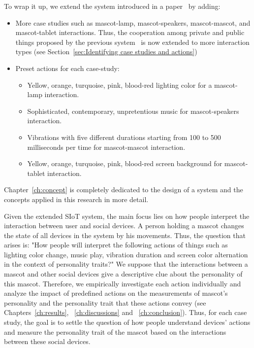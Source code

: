 To wrap it up, we extend the system introduced in a paper~\cite{okada2016autonomous} by adding:
\begin{itemize}
    \item More case studies such as mascot-lamp, mascot-speakers, mascot-mascot, and mascot-tablet interactions.
    Thus, the cooperation among private and public things proposed by the previous system~\cite{okada2016autonomous}
    is now extended to more interaction types (see Section~\ref{sec:Identifying case studies and actions})
    \item Preset actions for each case-study:
    \begin{itemize}
        \item Yellow, orange, turquoise, pink, blood-red lighting color for a mascot-lamp interaction.
        \item Sophisticated, contemporary, unpretentious music for mascot-speakers interaction.
        \item Vibrations with five different durations starting from 100 to
        500 milliseconds per time for mascot-mascot interaction.
        \item Yellow, orange, turquoise, pink, blood-red screen background for mascot-tablet interaction.
    \end{itemize}
\end{itemize}
Chapter~\ref{ch:concept} is completely dedicated to the design of a system and
the concepts applied in this research in more detail.

Given the extended SIoT system, the main focus lies on how people interpret
the interaction between user and social devices.
A person holding a mascot changes the state of all devices in the system by his movements.
Thus, the question that arises is: "How people will interpret the following actions of things such as
lighting color change, music play, vibration duration and screen color
alternation in the context of personality traits?"
We suppose that the interactions between a mascot and other social
devices give a descriptive clue about the personality of this mascot.
Therefore, we empirically investigate each action individually and analyze the impact of predefined
actions on the measurements of mascot's personality and the personality trait
that these actions convey (see Chapters~\ref{ch:results}, ~\ref{ch:discussions} and ~\ref{ch:conclusion}).
Thus, for each case study, the goal is to settle the question of how people understand devices' actions
and measure the personality trait of the mascot based on the interactions between these social devices.

